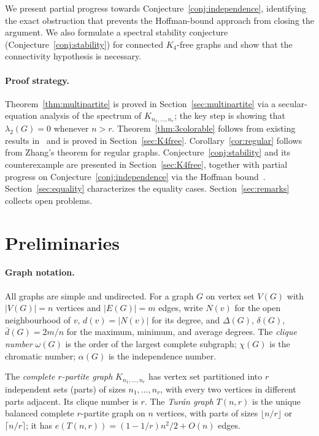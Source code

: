 \documentclass[preprint,12pt]{elsarticle}
\theoremstyle{plain}
\theoremstyle{definition}
\begin{document}
We present partial progress towards Conjecture~\ref{conj:independence},
identifying the exact obstruction that prevents the Hoffman-bound approach
from closing the argument.
We also formulate a spectral stability conjecture
(Conjecture~\ref{conj:stability}) for connected $K_4$-free graphs and show
that the connectivity hypothesis is necessary.

\paragraph{Proof strategy.}
Theorem~\ref{thm:multipartite} is proved in Section~\ref{sec:multipartite}
via a secular-equation analysis of the spectrum of $K_{n_1,\ldots,n_r}$;
the key step is showing that $\lambda_2(G) = 0$ whenever $n > r$.
Theorem~\ref{thm:3colorable} follows from existing results
in~\cite{BollobasNikiforov2007,LinNingWu2021} and is proved in
Section~\ref{sec:K4free}.
Corollary~\ref{cor:regular} follows from Zhang's theorem for regular graphs.
Conjecture~\ref{conj:stability} and its counterexample are presented in
Section~\ref{sec:K4free}, together with partial progress on
Conjecture~\ref{conj:independence} via the Hoffman bound~\cite{Hoffman1970}.
Section~\ref{sec:equality} characterizes the equality cases.
Section~\ref{sec:remarks} collects open problems.

\section{Preliminaries}
\label{sec:prelim}

\paragraph{Graph notation.}
All graphs are simple and undirected.
For a graph $G$ on vertex set $V(G)$ with $|V(G)| = n$ vertices and
$|E(G)| = m$ edges, write $N(v)$ for the open neighbourhood of $v$,
$d(v) = |N(v)|$ for its degree, and $\Delta(G)$, $\delta(G)$,
$\bar{d}(G) = 2m/n$ for the maximum, minimum, and average degrees.
The \emph{clique number} $\omega(G)$ is the order of the largest complete
subgraph; $\chi(G)$ is the chromatic number; $\alpha(G)$ is the
independence number.

The \emph{complete $r$-partite graph} $K_{n_1,\ldots,n_r}$ has vertex
set partitioned into $r$ independent sets (parts) of sizes
$n_1,\ldots,n_r$, with every two vertices in different parts adjacent.
Its clique number is $r$.
The \emph{Tur\'an graph} $T(n,r)$ is the unique balanced complete
$r$-partite graph on $n$ vertices, with parts of sizes
$\lfloor n/r \rfloor$ or $\lceil n/r \rceil$; it has
$e(T(n,r)) = (1-1/r)n^2/2 + O(n)$ edges.
\end{document}
